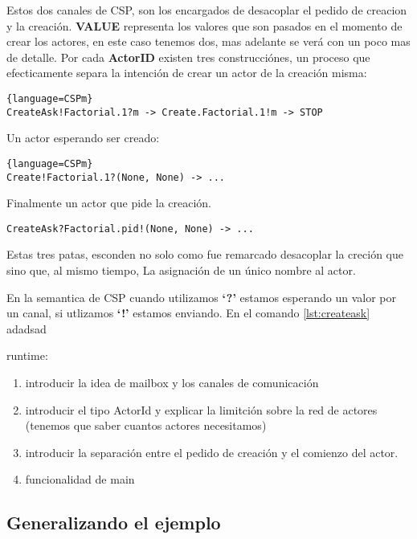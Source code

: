 \documentclass[fleqn]{article}
\begin{document}
Estos dos canales de CSP, son los encargados de desacoplar el pedido de creacion
y la creación. \textbf{VALUE} representa los valores que son pasados en el
momento de crear los actores, en este caso tenemos dos, mas adelante se verá con
un poco mas de detalle.
Por cada \textbf{ActorID} existen tres construcciónes, un proceso que
efecticamente separa la intención de crear un actor de la creación misma:

\begin{lstlisting}{language=CSPm}
CreateAsk!Factorial.1?m -> Create.Factorial.1!m -> STOP
\end{lstlisting}

Un actor esperando ser creado:

\begin{lstlisting}{language=CSPm}
Create!Factorial.1?(None, None) -> ...
\end{lstlisting}

Finalmente un actor que pide la creación.

\begin{lstlisting}[label={lst:createask},language=CSPm]
  CreateAsk?Factorial.pid!(None, None) -> ...
\end{lstlisting}

Estas tres patas, esconden no solo como fue remarcado desacoplar la creción que
sino que, al mismo tiempo, La asignación de un único nombre al actor.

En la semantica de CSP cuando utilizamos \textbf{`?'} estamos esperando un valor
por un canal, si utlizamos \textbf{`!'} estamos enviando. En el comando
\ref{lst:createask} adadsad



runtime: 
\begin{enumerate}
\item  introducir la idea de mailbox y los canales de comunicación
\item introducir el tipo ActorId y explicar la limitción sobre la red de actores
(tenemos que saber cuantos actores necesitamos)
\item introducir la separación entre el pedido de creación y el comienzo del actor.
\item funcionalidad de main
\end{enumerate}

\subsection{Generalizando el ejemplo}
\end{document}
